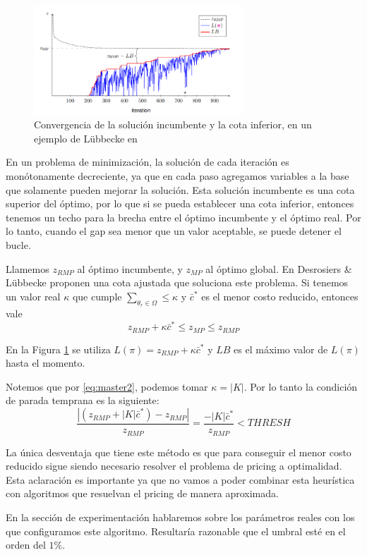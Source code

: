 \begin{figure}[H]
\centering
\includegraphics[width=0.7\textwidth]{img/Screenshot from 2023-10-11 00-03-23.png}
\caption{Convergencia de la solución incumbente y la cota inferior, en un ejemplo de Lübbecke en \cite{co-at-work-luebbecke}}
\label{fig:bound-convergence}
\centering
\end{figure}

En un problema de minimización, la solución de cada iteración es monótonamente decreciente, ya que en cada paso agregamos variables a la base que solamente pueden mejorar la solución. Esta solución incumbente es una cota superior del óptimo, por lo que si se pueda establecer una cota inferior, entonces tenemos un techo para la brecha entre el óptimo incumbente y el óptimo real. Por lo tanto, cuando el gap sea menor que un valor aceptable, se puede detener el bucle.

Llamemos $z_{RMP}$ al óptimo incumbente, y $z_{MP}$ al óptimo global. En \cite{desrosiers2005primer} Desrosiers \& Lübbecke proponen una cota ajustada que soluciona este problema. Si tenemos un valor real $\kappa$ que cumple $\sum_{\theta_r \in \Omega} \leq \kappa$ y $\bar{c}^{*}$ es el menor costo reducido, entonces vale
\begin{equation}
    z_{RMP} + \kappa \bar{c}^{*} \leq z_{MP} \leq z_{RMP}
\end{equation}

En la Figura \ref{fig:bound-convergence} se utiliza $L(\pi) = z_{RMP} + \kappa \bar{c}^{*}$ y $LB$ es el máximo valor de $L(\pi)$ hasta el momento.

Notemos que por \ref{eq:master2}, podemos tomar $\kappa = |K|$. Por lo tanto la condición de parada temprana es la siguiente:
\begin{equation}
     \frac{|(z_{RMP} + |K| \bar{c}^{*}) - z_{RMP}|}{z_{RMP}} = \frac{-|K| \bar{c}^{*}}{z_{RMP}}  < THRESH
\end{equation}

La única desventaja que tiene este método es que para conseguir el menor costo reducido sigue siendo necesario resolver el problema de pricing a optimalidad. Esta aclaración es importante ya que no vamos a poder combinar esta heurística con algoritmos que resuelvan el pricing de manera aproximada.

En la sección de experimentación hablaremos sobre los parámetros reales con los que configuramos este algoritmo. Resultaría razonable que el umbral esté en el orden del $1\%$.
